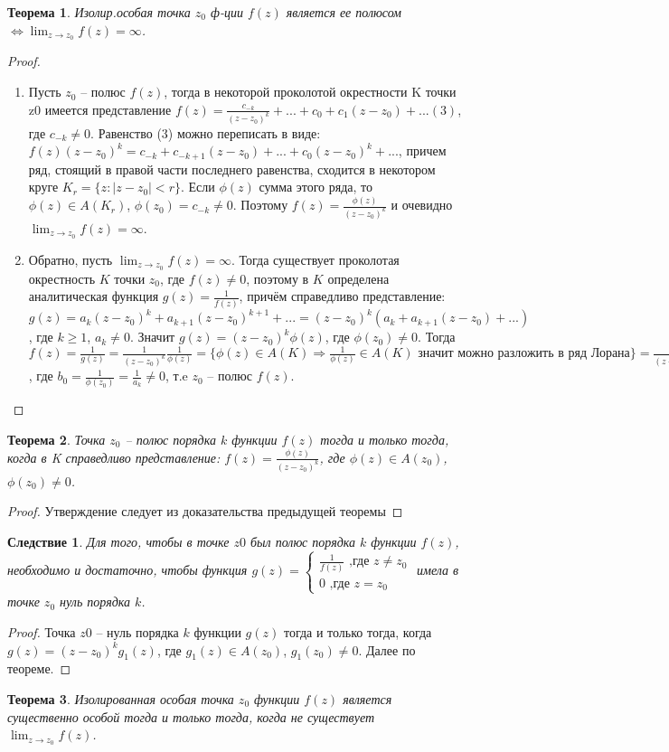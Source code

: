 \documentclass{article}
\newtheorem{theorem}{Теорема}[]
\newtheorem{sle}{Следствие}
\begin{document}
\begin{theorem}
   Изолир.особая точка $z_0$ ф-ции $f(z)$ является ее полюсом $\Longleftrightarrow \displaystyle\lim_{z\rightarrow z_0}f(z)=\infty$.
\end{theorem}
\begin{proof}
\begin{enumerate}
    \item Пусть $z_0$ – полюс $f(z)$, тогда в некоторой проколотой окрестности K точки z0 имеется представление $f(z)=\frac{c_{-k}}{(z-z_0)^k}+...+c_0+c_1(z-z_0)+...(3)$,
    где $c_{-k}\neq0$. Равенство (3) можно переписать в виде:
    $f(z)(z-z_0)^k=c_{-k}+c_{-k+1}(z-z_0)+...+c_0(z-z_0)^k+...$, причем ряд, стоящий в правой части последнего равенства, сходится в некотором круге $K_r=\{z:|z-z_0|<r\}$. Если $\phi(z)$ сумма этого ряда, то $\phi(z) \in A(K_r)$, $\phi(z_0)=c_{-k}\neq0$. Поэтому $f(z)=\frac{\phi(z)}{(z-z_0)^k}$ и очевидно $\displaystyle\lim_{z\rightarrow z_0}f(z)=\infty$.
    \item Обратно, пусть $\displaystyle\lim_{z\rightarrow z_0}f(z)=\infty$. Тогда существует
    проколотая окрестность $K$ точки $z_0$, где $f(z) \neq 0$, поэтому
    в $K$ определена аналитическая функция $g(z) = \frac{1}{f(z)}$, причём справедливо представление: $g(z)=a_k(z-z_0)^k+a_{k+1}(z-z_0)^{k+1}+...=(z-z_0)^k(a_k+a_{k+1}(z-z_0)+...)$, где $k\geq1$, $a_k\neq0$. Значит $g(z)=(z-z_0)^k\phi(z)$, где $\phi(z_0)\neq0$. Тогда $f(z)=\frac{1}{g(z)}=\frac{1}{(z-z_0)^k}\frac{1}{\phi(z)}=\{\phi(z) \in A(K) \Rightarrow \frac{1}{\phi(z)} \in A(K) \text{ значит можно разложить в ряд Лорана}\}=
    \frac{1}{(z-z_0)^k}(b_0+b_1(z-z_0)+...)$, где $b_0=\frac{1}{\phi(z_0)}=\frac{1}{a_k}\neq0$, т.e $z_0$ -- полюс $f(z)$.
\end{enumerate}
\end{proof}
\begin{theorem}
   Точка $z_0$ – полюс порядка $k$ функции $f(z)$ тогда и только тогда, когда в K справедливо
   представление: $f(z)=\frac{\phi(z)}{(z-z_0)^k}$, где $\phi(z)\in A(z_0)$, $\phi(z_0)\neq 0$.
\end{theorem}
\begin{proof}
    Утверждение следует из доказательства предыдущей теоремы
\end{proof}
\begin{sle}
Для того, чтобы в точке $z0$ был полюс
порядка $k$ функции $f(z)$, необходимо и достаточно, чтобы функция $g(z)=\begin{cases}
    \frac{1}{f(z)} \text{ ,где } z\neq z_0\\
    0\text{ ,где } z=z_0
   \end{cases}$ имела в точке $z_0$ нуль порядка $k$.
\end{sle}
\begin{proof}
    Точка $z0$ – нуль порядка $k$ функции $g(z)$ тогда и только тогда, когда $g(z)=(z-z_0)^kg_1(z)$, где $g_1(z) \in A(z_0)$, $g_1(z_0)\neq0$. Далее по теореме.
\end{proof}
\begin{theorem}
   Изолированная особая точка $z_0$ функции
    $f(z)$ является существенно особой тогда и только тогда,
    когда не существует $\displaystyle\lim_{z\rightarrow z_0}f(z)$.
\end{theorem}
\end{document}
